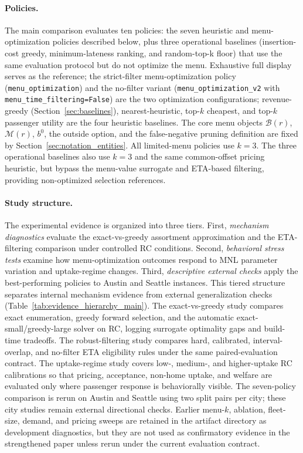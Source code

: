 \paragraph{Policies.} The main comparison evaluates ten policies: the seven heuristic and menu-optimization policies described below, plus three operational baselines (insertion-cost greedy, minimum-lateness ranking, and random-top-k floor) that use the same evaluation protocol but do not optimize the menu.
Exhaustive full display serves as the reference; the strict-filter menu-optimization policy
(\texttt{menu\_optimization}) and the no-filter variant
(\texttt{menu\_optimization\_v2} with
\texttt{menu\_time\_filtering=False}) are the two optimization configurations; revenue-greedy
(Section~\ref{sec:baselines}), nearest-heuristic, top-$k$ cheapest, and top-$k$
passenger utility are the four heuristic baselines.
The core menu objects $\mathcal{B}(r)$, $\mathcal{M}(r)$, $b^0$, the outside option, and the false-negative pruning definition are fixed by Section~\ref{sec:notation_entities}. All limited-menu policies use $k = 3$. The three operational baselines also use $k = 3$ and the same common-offset pricing heuristic, but bypass the menu-value surrogate and ETA-based filtering, providing non-optimized selection references.

\paragraph{Study structure.} The experimental evidence is organized into three tiers. First, \textit{mechanism diagnostics} evaluate the exact-vs-greedy assortment approximation and the ETA-filtering comparison under controlled RC conditions. Second, \textit{behavioral stress tests} examine how menu-optimization outcomes respond to MNL parameter variation and uptake-regime changes. Third, \textit{descriptive external checks} apply the best-performing policies to Austin and Seattle instances. This tiered structure separates internal mechanism evidence from external generalization checks (Table~\ref{tab:evidence_hierarchy_main}). The exact-vs-greedy study compares exact enumeration, greedy forward selection, and the automatic exact-small/greedy-large solver on RC, logging surrogate optimality gaps and build-time tradeoffs. The robust-filtering study compares hard, calibrated, interval-overlap, and no-filter ETA eligibility rules under the same paired-evaluation contract. The uptake-regime study covers low-, medium-, and higher-uptake RC calibrations so that pricing, acceptance, non-home uptake, and welfare are evaluated only where passenger response is behaviorally visible. The seven-policy comparison is rerun on Austin and Seattle using two split pairs per city; these city studies remain external directional checks. Earlier menu-$k$, ablation, fleet-size, demand, and pricing sweeps are retained in the artifact directory as development diagnostics, but they are not used as confirmatory evidence in the strengthened paper unless rerun under the current evaluation contract.

